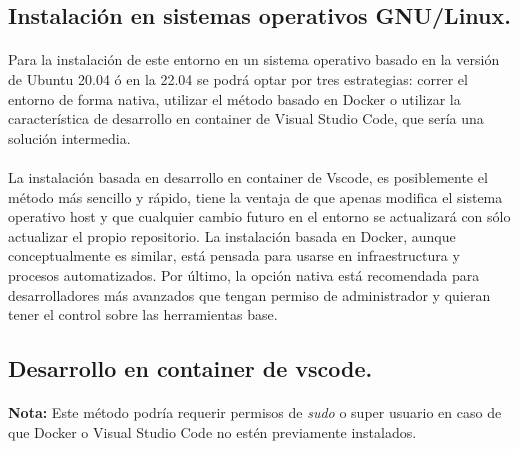 \subsection{Instalación en sistemas operativos GNU/Linux.}

\paragraph{}Para la instalación de este entorno en un sistema operativo basado en
la versión de Ubuntu 20.04 ó en la 22.04 se podrá optar por tres estrategias: correr
el entorno de forma nativa, utilizar el método basado en Docker o utilizar la característica
de desarrollo en container de Visual Studio Code, que sería una solución intermedia.

\paragraph{}La instalación basada en desarrollo en container de Vscode, es posiblemente
el método más sencillo y rápido, tiene la ventaja de que apenas modifica el sistema operativo
host y que cualquier cambio futuro en el entorno se actualizará con sólo actualizar el
propio repositorio. La instalación basada en Docker, aunque conceptualmente es similar,
está pensada para usarse en infraestructura y procesos automatizados. Por último, la opción
nativa está recomendada para desarrolladores más avanzados que tengan permiso de administrador
y quieran tener el control sobre las herramientas base.

\subsection{Desarrollo en container de vscode.}

\paragraph{}\textbf{Nota:} Este método podría requerir permisos de \emph{sudo} o super
usuario en caso de que Docker o Visual Studio Code no estén previamente instalados.

